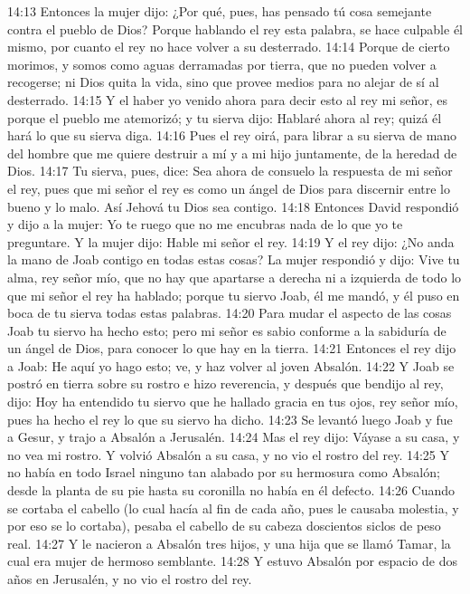 14:13 Entonces la mujer dijo: ¿Por qué, pues, has pensado tú cosa semejante contra el pueblo de Dios? Porque hablando el rey esta palabra, se hace culpable él mismo, por cuanto el rey no hace volver a su desterrado.  
14:14 Porque de cierto morimos, y somos como aguas derramadas por tierra, que no pueden volver a recogerse; ni Dios quita la vida, sino que provee medios para no alejar de sí al desterrado.  
14:15 Y el haber yo venido ahora para decir esto al rey mi señor, es porque el pueblo me atemorizó; y tu sierva dijo: Hablaré ahora al rey; quizá él hará lo que su sierva diga.  
14:16 Pues el rey oirá, para librar a su sierva de mano del hombre que me quiere destruir a mí y a mi hijo juntamente, de la heredad de Dios.  
14:17 Tu sierva, pues, dice: Sea ahora de consuelo la respuesta de mi señor el rey, pues que mi señor el rey es como un ángel de Dios para discernir entre lo bueno y lo malo. Así Jehová tu Dios sea contigo.  
14:18 Entonces David respondió y dijo a la mujer: Yo te ruego que no me encubras nada de lo que yo te preguntare. Y la mujer dijo: Hable mi señor el rey.  
14:19 Y el rey dijo: ¿No anda la mano de Joab contigo en todas estas cosas? La mujer respondió y dijo: Vive tu alma, rey señor mío, que no hay que apartarse a derecha ni a izquierda de todo lo que mi señor el rey ha hablado; porque tu siervo Joab, él me mandó, y él puso en boca de tu sierva todas estas palabras.  
14:20 Para mudar el aspecto de las cosas Joab tu siervo ha hecho esto; pero mi señor es sabio conforme a la sabiduría de un ángel de Dios, para conocer lo que hay en la tierra.  
14:21 Entonces el rey dijo a Joab: He aquí yo hago esto; ve, y haz volver al joven Absalón.  
14:22 Y Joab se postró en tierra sobre su rostro e hizo reverencia, y después que bendijo al rey, dijo: Hoy ha entendido tu siervo que he hallado gracia en tus ojos, rey señor mío, pues ha hecho el rey lo que su siervo ha dicho.  
14:23 Se levantó luego Joab y fue a Gesur, y trajo a Absalón a Jerusalén.  
14:24 Mas el rey dijo: Váyase a su casa, y no vea mi rostro. Y volvió Absalón a su casa, y no vio el rostro del rey.  
14:25 Y no había en todo Israel ninguno tan alabado por su hermosura como Absalón; desde la planta de su pie hasta su coronilla no había en él defecto.  
14:26 Cuando se cortaba el cabello (lo cual hacía al fin de cada año, pues le causaba molestia, y por eso se lo cortaba), pesaba el cabello de su cabeza doscientos siclos   de peso real.  
14:27 Y le nacieron a Absalón tres hijos, y una hija que se llamó Tamar, la cual era mujer de hermoso semblante.  
14:28 Y estuvo Absalón por espacio de dos años en Jerusalén, y no vio el rostro del rey.  
